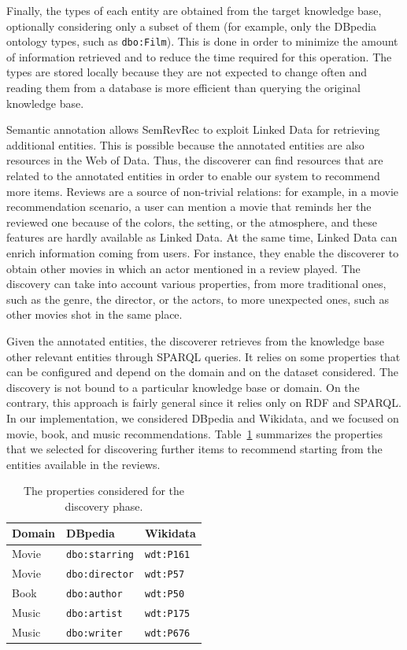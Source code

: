Finally, the types of each entity are obtained from the target knowledge base, optionally considering only a subset of them (for example, only the DBpedia ontology types, such as \texttt{dbo:Film}). This is done in order to minimize the amount of information retrieved and to reduce the time required for this operation. The types are stored locally because they are not expected to change often and reading them from a database is more efficient than querying the original knowledge base.

Semantic annotation allows SemRevRec to exploit Linked Data for retrieving additional entities. This is possible because the annotated entities are also resources in the Web of Data. Thus, the discoverer can find resources that are related to the annotated entities in order to enable our system to recommend more items. Reviews are a source of non-trivial relations: for example, in a movie recommendation scenario, a user can mention a movie that reminds her the reviewed one because of the colors, the setting, or the atmosphere, and these features are hardly available as Linked Data. At the same time, Linked Data can enrich information coming from users. For instance, they enable the discoverer to obtain other movies in which an actor mentioned in a review played. The discovery can take into account various properties, from more traditional ones, such as the genre, the director, or the actors, to more unexpected ones, such as other movies shot in the same place.

Given the annotated entities, the discoverer retrieves from the knowledge base other relevant entities through SPARQL queries. It relies on some properties that can be configured and depend on the domain and on the dataset considered. The discovery is not bound to a particular knowledge base or domain. On the contrary, this approach is fairly general since it relies only on RDF and SPARQL. In our implementation, we considered DBpedia and Wikidata, and we focused on movie, book, and music recommendations. Table~\ref{srr:tab:disc} summarizes the properties that we selected for discovering further items to recommend starting from the entities available in the reviews.

\begin{table}
\centering
\begin{tabular}{@{}lll@{}}
\toprule
Domain & DBpedia               & Wikidata          \\ \midrule
Movie  & \texttt{dbo:starring} & \texttt{wdt:P161} \\
Movie  & \texttt{dbo:director} & \texttt{wdt:P57}  \\
Book   & \texttt{dbo:author}   & \texttt{wdt:P50}  \\
Music  & \texttt{dbo:artist}   & \texttt{wdt:P175} \\
Music  & \texttt{dbo:writer}   & \texttt{wdt:P676} \\ \bottomrule
\end{tabular}
\caption[Properties of the discovery phase]{The properties considered for the discovery phase.}
\label{srr:tab:disc}
\end{table}

